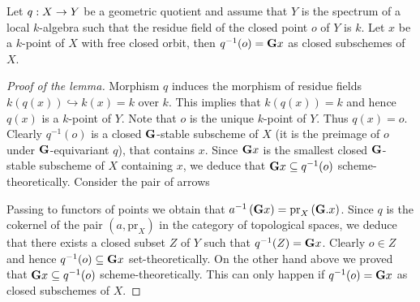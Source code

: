 \begin{lemma}\label{lemma:fiber_over_closed_point_is_orbit}
Let $q:X\rightarrow Y$ be a geometric quotient and assume that $Y$ is the spectrum of a local $k$-algebra such that the residue field of the closed point $o$ of $Y$ is $k$. Let $x$ be a $k$-point of $X$ with free closed orbit, then $q^{-1}(o) = \mathbf{G}x$ as closed subschemes of $X$. 
\end{lemma}
\begin{proof}[Proof of the lemma]
Morphism $q$ induces the morphism of residue fields $k(q(x)) \hookrightarrow k(x) = k$ over $k$. This implies that $k(q(x)) = k$ and hence $q(x)$ is a $k$-point of $Y$. Note that $o$ is the unique $k$-point of $Y$. Thus $q(x) = o$. Clearly $q^{-1}(o)$ is a closed $\mathbf{G}$-stable subscheme of $X$ (it is the preimage of $o$ under $\mathbf{G}$-equivariant $q$), that contains $x$. Since $\mathbf{G}x$ is the smallest closed $\mathbf{G}$-stable subscheme of $X$ containing $x$, we deduce that $\mathbf{G}x\subseteq q^{-1}(o)$ scheme-theoretically. Consider the pair of arrows
\begin{center}
\end{center}
Passing to functors of points we obtain that $a^{-1}\left(\mathbf{G}x\right) = \mathrm{pr}_X\left(\mathbf{G}.x\right)$. Since $q$ is the cokernel of the pair $(a,\mathrm{pr}_X)$ in the category of topological spaces, we deduce that there exists a closed subset $Z$ of $Y$ such that $q^{-1}(Z) = \mathbf{G}x$. Clearly $o\in Z$ and hence $q^{-1}(o) \subseteq \mathbf{G}x$ set-theoretically. On the other hand above we proved that $\mathbf{G}x\subseteq q^{-1}(o)$ scheme-theoretically. This can only happen if $q^{-1}(o) = \mathbf{G}x$ as closed subschemes of $X$.
\end{proof}

